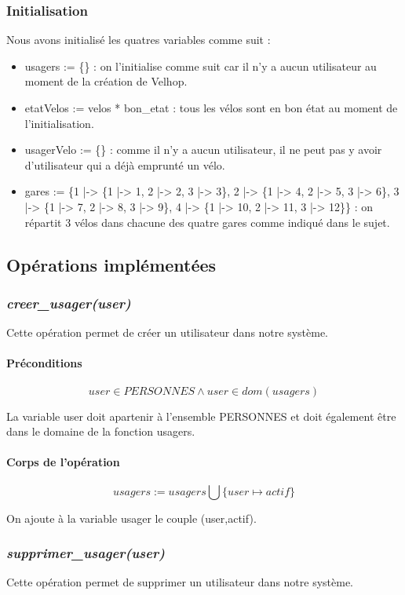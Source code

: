 \documentclass[12pt]{article}
\begin{document}
\subsubsection{Initialisation}
Nous avons initialisé les quatres variables comme suit :
\begin{itemize}
  \item usagers := \{\} : on l'initialise comme suit car il n'y a aucun utilisateur au moment de la création de Velhop.
  \item etatVelos := velos * {bon\_etat} : tous les vélos sont en bon état au moment de l'initialisation.
  \item usagerVelo := \{\} : comme il n'y a aucun utilisateur, il ne peut pas y avoir d'utilisateur qui a déjà emprunté un vélo.
  \item gares := \{1 |-> \{1 |-> 1, 2 |-> 2, 3 |-> 3\}, 2 |-> \{1 |-> 4, 2 |-> 5, 3 |-> 6\}, 3 |-> \{1 |-> 7, 2 |-> 8, 3 |-> 9\}, 4 |-> \{1 |-> 10, 2 |-> 11, 3 |-> 12\}\} : on répartit 3 vélos dans chacune des quatre gares comme indiqué dans le sujet.
\end{itemize}
\subsection{Opérations implémentées}
\subsubsection{\textit{creer\_usager(user)}}
Cette opération permet de créer un utilisateur dans notre système.
\paragraph{Préconditions}
\[user \in PERSONNES \land user \in dom(usagers)\]

La variable user doit apartenir à l'ensemble PERSONNES et doit également être dans le domaine de la fonction usagers.
\paragraph{Corps de l'opération}
\[ usagers := usagers \bigcup \{user \mapsto actif\} \]

On ajoute à la variable usager le couple (user,actif).
\subsubsection{\textit{supprimer\_usager(user)}}
Cette opération permet de supprimer un utilisateur dans notre système.
\end{document}
